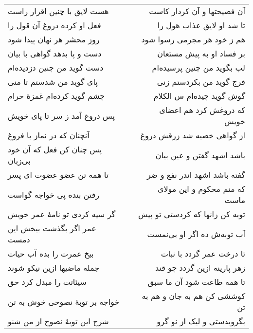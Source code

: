 \begin{center}
\begin{longtable}{l p{0.5cm} r}
\\
هست لایق با چنین اقرار راست
&&
آن فضیحتها و آن کردار کاست
\\
فعل او کرده دروغ آن قول را
&&
تا شد او لایق عذاب هول را
\\
روز محشر هر نهان پیدا شود
&&
هم ز خود هر مجرمی رسوا شود
\\
دست و پا بدهد گواهی با بیان
&&
بر فساد او به پیش مستعان
\\
دست گوید من چنین دزدیده‌ام
&&
لب بگوید من چنین پرسیده‌ام
\\
پای گوید من شدستم تا منی
&&
فرج گوید من بکردستم زنی
\\
چشم گوید کرده‌ام غمزهٔ حرام
&&
گوش گوید چیده‌ام س الکلام
\\
پس دروغ آمد ز سر تا پای خویش
&&
که دروغش کرد هم اعضای خویش
\\
آنچنان که در نماز با فروغ
&&
از گواهی خصیه شد زرقش دروغ
\\
پس چنان کن فعل که آن خود بی‌زبان
&&
باشد اشهد گفتن و عین بیان
\\
تا همه تن عضو عضوت ای پسر
&&
گفته باشد اشهد اندر نفع و ضر
\\
رفتن بنده پی خواجه گواست
&&
که منم محکوم و این مولای ماست
\\
گر سیه کردی تو نامهٔ عمر خویش
&&
توبه کن زانها که کردستی تو پیش
\\
عمر اگر بگذشت بیخش این دمست
&&
آب توبه‌ش ده اگر او بی‌نمست
\\
بیخ عمرت را بده آب حیات
&&
تا درخت عمر گردد با نبات
\\
جمله ماضیها ازین نیکو شوند
&&
زهر پارینه ازین گردد چو قند
\\
سیئاتت را مبدل کرد حق
&&
تا همه طاعت شود آن ما سبق
\\
خواجه بر توبهٔ نصوحی خوش به تن
&&
کوششی کن هم به جان و هم به تن
\\
شرح این توبهٔ نصوح از من شنو
&&
بگرویدستی و لیک از نو گرو
\\
\end{longtable}
\end{center}
